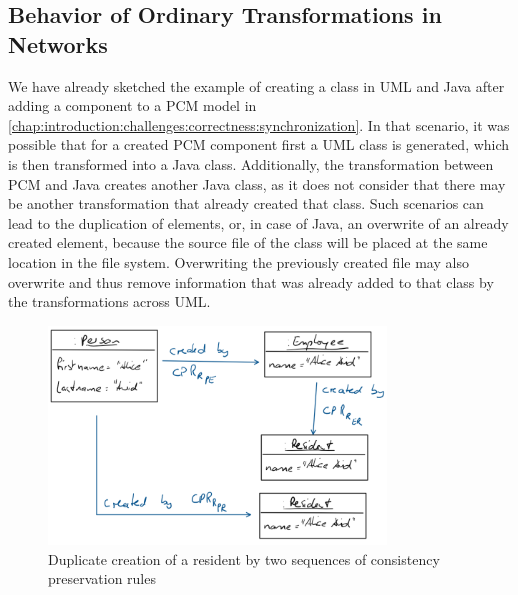 \subsection{Behavior of Ordinary Transformations in Networks}
We have already sketched the example of creating a class in UML and Java after adding a component to a \gls{PCM} model in \autoref{chap:introduction:challenges:correctness:synchronization}.
In that scenario, it was possible that for a created \gls{PCM} component first a UML class is generated, which is then transformed into a Java class.
Additionally, the transformation between \gls{PCM} and Java creates another Java class, as it does not consider that there may be another transformation that already created that class.
Such scenarios can lead to the duplication of elements, or, in case of Java, an overwrite of an already created element, because the source file of the class will be placed at the same location in the file system.
Overwriting the previously created file may also overwrite and thus remove information that was already added to that class by the transformations across UML.

\begin{figure}
    \centering
    \includegraphics[width=0.8\textwidth]{figures/correctness/synchronization/duplicate_creation_example.png}    
    \caption{Duplicate creation of a resident by two sequences of consistency preservation rules}
    \label{fig:synchronization:duplicate_creation_example}
\end{figure}

